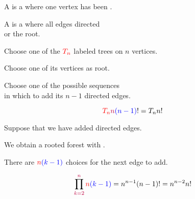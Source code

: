 \begin{frame}{}
  \begin{definition}
    A  is a 
    where one vertex has been .
  \end{definition}

  \pause

  \pause
  \begin{definition}
    A  is a 
    where all edges directed \\  or  the root.
  \end{definition}
\end{frame}

\begin{frame}{}
  \begin{center}
    Choose one of the $\textcolor{red}{T_{n}}$ labeled trees on $n$ vertices.

    \pause
    \vspace{0.60cm}
    Choose one of its  vertices as root.

    \pause
    \vspace{0.60cm}
    Choose one of the  possible sequences \\
    in which to add its $n-1$ directed edges.
  \end{center}

  \[
    \textcolor{red}{T_n} \textcolor{purple}{n}\textcolor{blue}{(n-1)}! = T_n n!
  \]
\end{frame}

\begin{frame}{}
  \begin{center}
    Suppose that we have added  directed edges.

    \pause
    \vspace{0.30cm}
    We obtain a rooted forest with .

    \pause
    \vspace{0.30cm}
    There are $\textcolor{red}{n}\textcolor{blue}{(k-1)}$ choices for the next edge to add.
  \end{center}

  \pause

  \pause
  \[
    \prod_{\textcolor{purple}{k=2}}^{\textcolor{purple}{n}} \textcolor{red}{n}\textcolor{blue}{(k-1)}
      = n^{n-1} (n-1)! = n^{n-2} n!
  \]
\end{frame}


